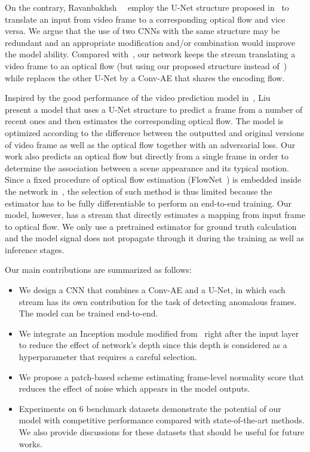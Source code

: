 \documentclass[10pt,twocolumn,letterpaper]{article}
\begin{document}
On the contrary, Ravanbakhsh~\etal~\cite{Ravanbakhsh2017Abnormal} employ the U-Net structure proposed in~\cite{Isola2017Image} to translate an input from video frame to a corresponding optical flow and vice versa. We argue that the use of two CNNs with the same structure may be redundant and an appropriate modification and/or combination would improve the model ability. Compared with~\cite{Ravanbakhsh2017Abnormal}, our network keeps the stream translating a video frame to an optical flow (but using our proposed structure instead of~\cite{Isola2017Image}) while replaces the other U-Net by a Conv-AE that shares the encoding flow.

Inspired by the good performance of the video prediction model in~\cite{Mathieu2015Deep}, Liu~\etal~\cite{Wen2018Future} present a model that uses a U-Net structure to predict a frame from a number of recent ones and then estimates the corresponding optical flow. The model is optimized according to the difference between the outputted and original versions of video frame as well as the optical flow together with an adversarial loss. Our work also predicts an optical flow but directly from a single frame in order to determine the association between a scene appearance and its typical motion. Since a fixed procedure of optical flow estimation (FlowNet~\cite{Dosovitskiy2015FlowNet}) is embedded inside the network in~\cite{Wen2018Future}, the selection of such method is thus limited because the estimator has to be fully differentiable to perform an end-to-end training. Our model, however, has a stream that directly estimates a mapping from input frame to optical flow. We only use a pretrained estimator for ground truth calculation and the model signal does not propagate through it during the training as well as inference stages.

Our main contributions are summarized as follows:
\begin{itemize}
	\item We design a CNN that combines a Conv-AE and a U-Net, in which each stream has its own contribution for the task of detecting anomalous frames. The model can be trained end-to-end.
	\item We integrate an Inception module modified from~\cite{Szegedy2016Rethinking} right after the input layer to reduce the effect of network's depth since this depth is considered as a hyperparameter that requires a careful selection.
	\item We propose a patch-based scheme estimating frame-level normality score that reduces the effect of noise which appears in the model outputs.
	\item Experiments on 6 benchmark datasets demonstrate the potential of our model with competitive performance compared with state-of-the-art methods. We also provide discussions for these datasets that should be useful for future works.
\end{itemize}
\end{document}
